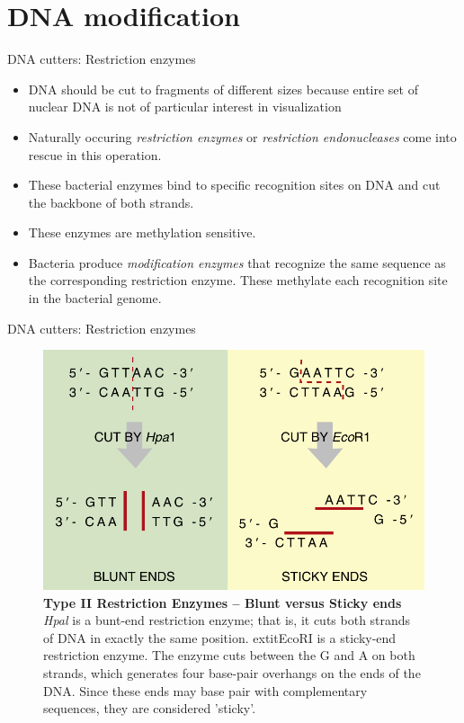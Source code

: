 \documentclass[
  ignorenonframetext,
  aspectratio=169]{beamer}
\providecommand{\tightlist}{%
  \setlength{\itemsep}{0pt}\setlength{\parskip}{0pt}}
\begin{document}
\hypertarget{dna-modification}{%
\section{DNA modification}\label{dna-modification}}

\begin{frame}{DNA cutters: Restriction enzymes}
\protect\hypertarget{dna-cutters-restriction-enzymes}{}
\begin{itemize}
\tightlist
\item
  DNA should be cut to fragments of different sizes because entire set
  of nuclear DNA is not of particular interest in visualization
\item
  Naturally occuring \emph{restriction enzymes} or \emph{restriction
  endonucleases} come into rescue in this operation.
\item
  These bacterial enzymes bind to specific recognition sites on DNA and
  cut the backbone of both strands.
\item
  These enzymes are methylation sensitive.
\item
  Bacteria produce \emph{modification enzymes} that recognize the same
  sequence as the corresponding restriction enzyme. These methylate each
  recognition site in the bacterial genome.
\end{itemize}
\end{frame}

\begin{frame}{DNA cutters: Restriction enzymes}
\protect\hypertarget{dna-cutters-restriction-enzymes-1}{}
\begin{figure}
\includegraphics[width=0.5\linewidth]{./../images/restriction_enzymes} \caption{\textbf{Type II Restriction Enzymes -- Blunt versus Sticky ends} \newline \textit{Hpal} is a bunt-end restriction enzyme; that is, it cuts both strands of DNA in exactly the same position.    extit{EcoR}I is a sticky-end restriction enzyme. The enzyme cuts between the G and A on both strands, which generates four base-pair overhangs on the ends of the DNA. Since these ends may base pair with complementary sequences, they are considered 'sticky'.}\label{fig:restriction-enzymes}
\end{figure}
\end{frame}
\end{document}
